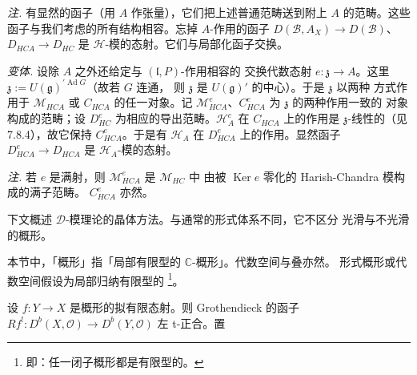 \emph{注.} 有显然的函子（用 $A$ 作张量），它们把上述普通范畴送到附上 $A$
的范畴。这些函子与我们考虑的所有结构相容。忘掉 $A$-作用的函子
$D(\mathcal{B},A_{X})\to D(\mathcal{B})$、$D_{HCA}\to D_{HC}$ 是
$\mathcal{H}$-模的态射。它们与局部化函子交换。

 \emph{变体.} 设除 $A$ 之外还给定与 $(\mathfrak{l},P)$-作用相容的
交换代数态射 $e:\mathfrak{z}\to A$。这里
$\mathfrak{z}:=U(\mathfrak{g})^{\prime\operatorname{Ad}G}$（故若 $G$ 连通，
则 $\mathfrak{z}$ 是 $U(\mathfrak{g})'$ 的中心）。于是 $\mathfrak{z}$ 以两种
方式作用于 $\mathcal{M}_{HCA}$ 或 $C_{HCA}$ 的任一对象。记
$\mathcal{M}^{e}_{HCA}$、$C^{e}_{HCA}$ 为 $\mathfrak{z}$ 的两种作用一致的
对象构成的范畴；设 $D^{e}_{HC}$ 为相应的导出范畴。$\mathcal{H}^{c}_{A}$ 在
$C_{HCA}$ 上的作用是 $\mathfrak{z}$-线性的（见 7.8.4），故它保持
$C^{e}_{HCA}$。于是有 $\mathcal{H}_{A}$ 在 $D^{e}_{HCA}$ 上的作用。显然函子
$D^{e}_{HCA}\to D_{HCA}$ 是 $\mathcal{H}_{A}$-模的态射。

\emph{注.} 若 $e$ 是满射，则 $\mathcal{M}^{e}_{HCA}$ 是 $\mathcal{M}_{HC}$ 中
由被 $\operatorname{Ker}e$ 零化的 Harish-Chandra 模构成的满子范畴。
$C^{e}_{HCA}$ 亦然。


下文概述 $\mathcal{D}$-模理论的晶体方法。与通常的形式体系不同，它不区分
光滑与不光滑的概形。

本节中，「概形」指「局部有限型的 $\mathbb{C}$-概形」。代数空间与叠亦然。
形式概形或代数空间假设为局部归纳有限型的
\footnote{即：任一闭子概形都是有限型的。}。

 设 $f:Y\to X$ 是概形的拟有限态射。则 Grothendieck 的函子
$Rf^{!}:D^{b}(X,\mathcal{O})\to D^{b}(Y,\mathcal{O})$ 左 t-正合。置

